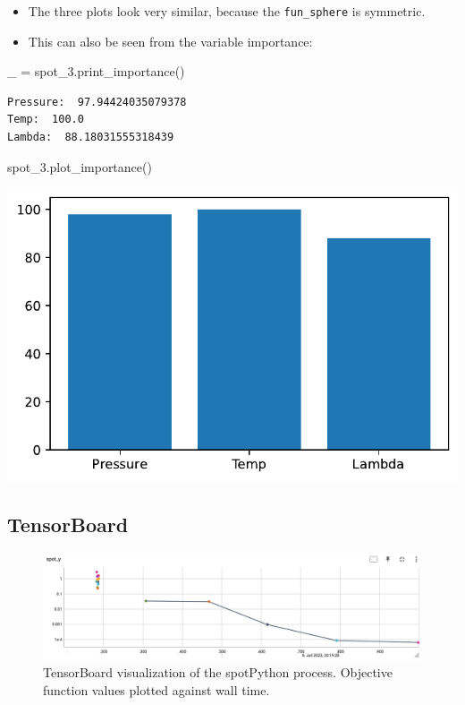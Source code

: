 \documentclass[
  letterpaper,
  DIV=11,
  numbers=noendperiod]{scrreprt}
\newenvironment{Shaded}{\begin{snugshade}}{\end{snugshade}}
\newcommand{\NormalTok}[1]{\textcolor[rgb]{0.00,0.23,0.31}{#1}}
\newcommand{\OperatorTok}[1]{\textcolor[rgb]{0.37,0.37,0.37}{#1}}
\providecommand{\tightlist}{%
  \setlength{\itemsep}{0pt}\setlength{\parskip}{0pt}}\usepackage{longtable,booktabs,array}
\begin{document}
\begin{itemize}
\tightlist
\item
  The three plots look very similar, because the \texttt{fun\_sphere} is
  symmetric.
\item
  This can also be seen from the variable importance:
\end{itemize}

\begin{Shaded}
\begin{Highlighting}[]
\NormalTok{\_ }\OperatorTok{=}\NormalTok{ spot\_3.print\_importance()}
\end{Highlighting}
\end{Shaded}

\begin{verbatim}
Pressure:  97.94424035079378
Temp:  100.0
Lambda:  88.18031555318439
\end{verbatim}

\begin{Shaded}
\begin{Highlighting}[]
\NormalTok{spot\_3.plot\_importance()}
\end{Highlighting}
\end{Shaded}

\includegraphics{008_num_spot_multidim_files/figure-pdf/cell-11-output-1.pdf}

\subsection{TensorBoard}\label{tensorboard-2}

\begin{figure}[H]

{\centering \includegraphics{figures_static/02_tensorboard_01.png}

}

\caption{TensorBoard visualization of the spotPython process. Objective
function values plotted against wall time.}

\end{figure}%
\end{document}
